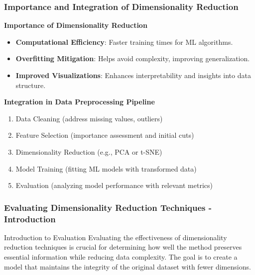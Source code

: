 \documentclass[aspectratio=169]{beamer}
\begin{document}
\begin{frame}[fragile]
    \frametitle{Importance and Integration of Dimensionality Reduction}
    \textbf{Importance of Dimensionality Reduction}
    \begin{itemize}
        \item \textbf{Computational Efficiency}: Faster training times for ML algorithms.
        \item \textbf{Overfitting Mitigation}: Helps avoid complexity, improving generalization.
        \item \textbf{Improved Visualizations}: Enhances interpretability and insights into data structure.
    \end{itemize}

    \textbf{Integration in Data Preprocessing Pipeline}
    \begin{enumerate}
        \item Data Cleaning (address missing values, outliers)
        \item Feature Selection (importance assessment and initial cuts)
        \item Dimensionality Reduction (e.g., PCA or t-SNE)
        \item Model Training (fitting ML models with transformed data)
        \item Evaluation (analyzing model performance with relevant metrics)
    \end{enumerate}
\end{frame}

\begin{frame}[fragile]
    \frametitle{Evaluating Dimensionality Reduction Techniques - Introduction}
    \begin{block}{Introduction to Evaluation}
        Evaluating the effectiveness of dimensionality reduction techniques is crucial for determining how well the method preserves essential information while reducing data complexity. The goal is to create a model that maintains the integrity of the original dataset with fewer dimensions.
    \end{block}
\end{frame}
\end{document}
